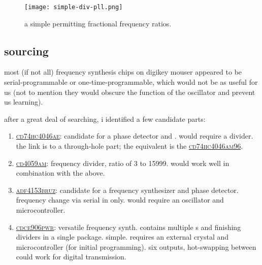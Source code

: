 \begin{figure}[H]
	\centering
	\texttt{[image: simple-div-pll.png]}
	\caption{a simple \pll permitting fractional frequency ratios.}
	\label{fig:simple-div-pll}
\end{figure}

\subsection*{sourcing}
most (if not all) frequency synthesis chips on digikey \amp mouser appeared to
be serial-programmable or one-time-programmable, which would not be as useful
for us (not to mention they would obscure the function of the oscillator and
prevent us learning).

after a great deal of searching, i identified a few candidate parts:
\begin{enumerate}
	\item
	\href{https://www.digikey.com/en/products/detail/texas-instruments/CD74HC4046AE/376781}{\textsc{cd74hc4046ae}}:
	candidate for a phase detector and \vco. would require a divider. the
	link is to a through-hole part; the \smd equivalent is the
	\href{https://www.digikey.com/en/products/detail/texas-instruments/CD74HC4046AM96/555822}{\textsc{cd74hc4046am96}}.

	\item
	\href{https://www.digikey.com/en/products/detail/texas-instruments/CD4059AM/1691226}{\textsc{cd4059am}}:
	frequency divider, ratio of 3 to 15999. would work well in combination
	with the above.

	\item
	\href{https://www.digikey.com/en/products/detail/analog-devices-inc/ADF4153BRUZ/820043}{\textsc{adf4153bruz}}:
	candidate for a frequency synthesizer and phase detector. frequency
	change via serial in only. would require an oscillator and
	microcontroller.

	\item
	\href{https://www.digikey.com/en/products/detail/texas-instruments/CDCE906PWR/1508159}{\textsc{cdce906pwr}}:
	versatile frequency synth. contains multiple {\pll}s and finishing
	dividers in a single package. simple. requires an external crystal and
	microcontroller (for initial programming). six outputs, hot-swapping
	between could work for digital \fm transmission.
\end{enumerate}
